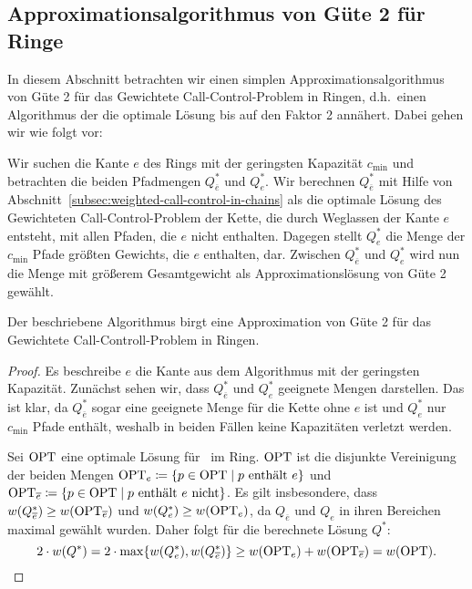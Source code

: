 \subsection{Approximationsalgorithmus von Güte 2 für Ringe}
In diesem Abschnitt betrachten wir einen simplen Approximationsalgorithmus von Güte 2 für das Gewichtete
Call-Control-Problem in Ringen, d.h.\ einen Algorithmus der die optimale Lösung bis auf den Faktor 2 annähert.
Dabei gehen wir wie folgt vor:

Wir suchen die Kante $e$ des Rings mit der geringsten Kapazität $c_{\min}$ und betrachten die beiden Pfadmengen
$Q_{\overline e}^*$ und $Q_{e}^*$.
Wir berechnen $Q_{\overline e}^*$ mit Hilfe von Abschnitt~\ref{subsec:weighted-call-control-in-chains} als die
optimale Lösung des Gewichteten Call-Control-Problem der Kette, die durch
Weglassen der Kante $e$ entsteht, mit allen Pfaden, die $e$ nicht enthalten.
Dagegen stellt $Q_e^*$ die Menge der $c_{\min}$ Pfade größten Gewichts, die $e$ enthalten, dar.
Zwischen $Q_{\overline e}^*$ und $Q_{e}^*$ wird nun die Menge mit größerem Gesamtgewicht als
Approximationslösung von Güte 2 gewählt.

\begin{theorem}
    Der beschriebene Algorithmus birgt eine Approximation von Güte 2 für das Gewichtete Call-Controll-Problem in Ringen.
\end{theorem}
\begin{proof}
    Es beschreibe $e$ die Kante aus dem Algorithmus mit der geringsten Kapazität.
    Zunächst sehen wir, dass $Q_{\overline e}^*$ und $Q_e^*$ geeignete Mengen darstellen.
    Das ist klar, da $Q_{\overline e}^*$ sogar eine geeignete Menge für die Kette ohne $e$ ist und $Q_e^*$ nur $c_{\min}$
    Pfade enthält, weshalb in beiden Fällen keine Kapazitäten verletzt werden.

    Sei $\text{OPT}$ eine optimale Lösung für \WeightedCallControl\ im Ring.
    $\text{OPT}$ ist die disjunkte Vereinigung der beiden Mengen $\text{OPT}_e \coloneqq \{p \in \text{OPT} \mid p\ \text{enthält}\ e\}$ und
    $\OPT_{\overline e} \coloneqq \{p\in\OPT\mid p\ \text{enthält}\ e\ \text{nicht}\}$.
    Es gilt insbesondere, dass $w(Q_{\overline e}^*) \geq w(\text{OPT}_{\overline e})$ und
    $w(Q_e^*) \geq w(\text{OPT}_{e})$, da $Q_{\overline e}$ und $Q_e$ in ihren Bereichen maximal gewählt wurden.
    Daher folgt für die berechnete Lösung $Q^*$:
    \[2 \cdot w(Q^*) = 2 \cdot  \max\{w(Q_e^*), w(Q_{\overline e}^*)\} \geq
    w(\text{OPT}_e) + w(\text{OPT}_{\overline e}) = w(\text{OPT}) .\]
\end{proof}
